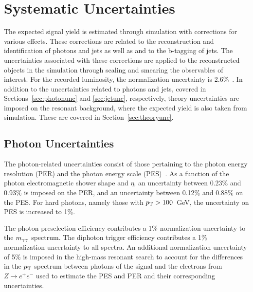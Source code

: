 \chapter{Systematic Uncertainties\label{ch:uncertainties}}

The expected signal yield is estimated through simulation with corrections for various effects.
These corrections are related to the reconstruction and identification of photons and jets as well as
and to the b-tagging of jets.
The uncertainties associated with these corrections are applied to the reconstructed objects in
the simulation through scaling and smearing the observables of interest.
For the recorded luminosity, the normalization uncertainty is 2.6\%~\cite{CMS-PAS-LUM-13-001}.
In addition to the uncertainties related to photons and jets, covered in
Sections~\ref{sec:photonunc} and \ref{sec:jetunc}, respectively, theory uncertainties are imposed
on the resonant background, where the expected yield is also taken from simulation. These are covered
in Section~\ref{sec:theoryunc}.


\section{Photon Uncertainties\label{sec:photonunc}}

The photon-related uncertainties consist of those pertaining to the photon energy resolution (PER)
and the photon energy scale (PES)~\cite{CMS-PAS-HIG-13-001}. As a function of the photon
electromagnetic shower shape and $\eta$,
an uncertainty between 0.23\% and 0.93\% is imposed on the PER,
and an uncertainty between 0.12\% and 0.88\% on the PES. For hard photons, namely those with
$p_{{\rm T}} > 100$~GeV, the uncertainty on PES is increased to 1\%.

The photon preselection efficiency contributes a 1\% normalization uncertainty to the $m_{\gamma\gamma}$
spectrum. The diphoton trigger efficiency contributes a 1\% normalization
uncertainty to all spectra.
An additional normalization uncertainty of 5\% is imposed in the high-mass resonant search
to account for the differences in the $p_{\rm T}$ spectrum between photons of the signal
and the electrons from $Z\rightarrow e^+ e^-$ used to estimate the PES and PER and their
corresponding uncertainties.

